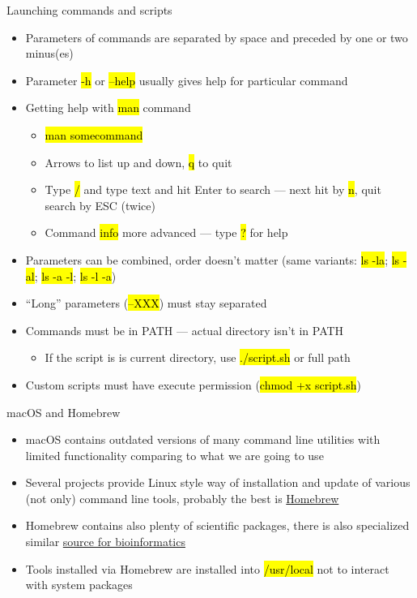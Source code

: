 \documentclass[compress, ucs, xelatex, 11pt, xcolor=svgnames,
  hyperref={
    bookmarks=true,
    unicode=true,
    colorlinks=true,
    pdftitle={Linux, command line and MetaCentrum},
    plainpages=false,
    pdfauthor={Vojtech Zeisek},
    pdfsubject={Course about use of Linux command line, writing shell scripts and using MetaCentrum of CESNET},
    pdfcreator={XeLaTeX},
    pdfkeywords={Linux, GNU, BASH, shell, command line, MetaCentrum},
    linkcolor=DarkRed,
    anchorcolor=DarkBlue,
    citecolor=Indigo,
    filecolor=NavyBlue,
    menucolor=DarkMagenta,
    urlcolor=DarkBlue,
    pdftex},
  url={hyphens, lowtilde} %
  ]{beamer}
\renewcommand{\texttt}[1]{\hl{\ttfamily #1}}
\begin{document}
\begin{frame}{Launching commands and scripts}
  \begin{itemize}
    \item Parameters of commands are separated by space and preceded by one or two minus(es)
    \item Parameter \texttt{-h} or \texttt{--help} usually gives help for particular command
    \item Getting help with \texttt{man} command
    \begin{itemize}
      \item \texttt{man somecommand}
      \item Arrows to list up and down, \texttt{q} to quit
      \item Type \texttt{/} and type text and hit Enter to search --- next hit by \texttt{n}, quit search by ESC (twice)
      \item Command \texttt{info} more advanced --- type \texttt{?} for help
    \end{itemize}
    \item Parameters can be combined, order doesn't matter (same variants: \texttt{ls -la}; \texttt{ls -al}; \texttt{ls -a -l}; \texttt{ls -l -a})
    \item ``Long'' parameters (\texttt{--XXX}) must stay separated
    \item Commands must be in PATH --- actual directory isn't in PATH
    \begin{itemize}
      \item If the script is is current directory, use \texttt{./script.sh} or full path
    \end{itemize}
    \item Custom scripts must have execute permission (\texttt{chmod +x script.sh})
  \end{itemize}
\end{frame}

\begin{frame}{macOS and Homebrew}
  \label{homebrew}
  \begin{itemize}
    \item macOS contains outdated versions of many command line utilities with limited functionality comparing to what we are going to use
    \item Several projects provide Linux style way of installation and update of various (not only) command line tools, probably the best is \href{https://brew.sh/}{Homebrew}
    \item Homebrew contains also plenty of scientific packages, there is also specialized similar \href{https://brewsci.github.io/homebrew-bio/}{source for bioinformatics}
    \item Tools installed via Homebrew are installed into \texttt{/usr/local} not to interact with system packages
  \end{itemize}
\end{frame}
\end{document}
